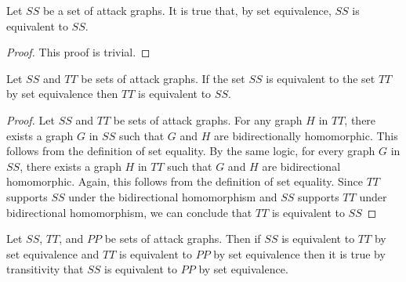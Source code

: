 \documentclass[runningheads]{llncs}
\theoremstyle{definition}
\begin{document}
\begin{theorem}
    Let $SS$ be a set of attack graphs. It is true that, by set equivalence, $SS$ is equivalent to $SS$.
\end{theorem}
\begin{proof}
    This proof is trivial.  
\end{proof}


\begin{theorem}
    Let $SS$ and $TT$ be sets of attack graphs. If the set $SS$ is equivalent to the set $TT$ by set equivalence then $TT$ is equivalent to $SS$. 
\end{theorem}
\begin{proof}
    Let $SS$ and $TT$ be sets of attack graphs. For any graph $H$ in $TT$, there exists a graph $G$ in $SS$ such that $G$ and $H$ are bidirectionally homomorphic. This follows from the definition of set equality. By the same logic, for every graph $G$ in $SS$, there exists a graph $H$ in $TT$ such that $G$ and $H$ are bidirectional homomorphic. Again, this follows from the definition of set equality. Since $TT$ supports $SS$ under the bidirectional homomorphism and $SS$ supports $TT$ under bidirectional homomorphism, we can conclude that $TT$ is equivalent to $SS$ 
\end{proof}

\begin{theorem}
    Let $SS$, $TT$, and $PP$ be sets of attack graphs. Then if $SS$ is equivalent to $TT$ by set equivalence and $TT$ is equivalent to $PP$ by set equivalence then it is true by transitivity that $SS$ is equivalent to $PP$ by set equivalence.   
\end{theorem}
\end{document}
